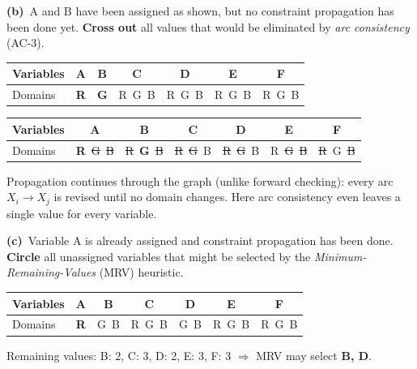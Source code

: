 \documentclass[11pt,a4paper]{article}
\newcommand{\subq}[1]{\par\smallskip\noindent\textbf{#1}\ }
\begin{document}
\subq{(b)}A and B have been assigned as shown, but no constraint propagation has been done yet. \textbf{Cross out} all values that would be eliminated by \emph{arc consistency} (AC-3).\begin{center}\small\begin{tabular}{|l|c|c|c|c|c|c|}\hline Variables & \textbf{A} & \textbf{B} & \textbf{C} & \textbf{D} & \textbf{E} & \textbf{F}\\ \hline Domains & \textbf{R} & \textbf{G} & R\ G\ B & R\ G\ B & R\ G\ B & R\ G\ B\\ \hline\end{tabular}\end{center}
\begin{solbox}
\begin{center}\small\begin{tabular}{|l|c|c|c|c|c|c|}\hline Variables & \textbf{A} & \textbf{B} & \textbf{C} & \textbf{D} & \textbf{E} & \textbf{F}\\ \hline Domains & \textbf{R}\ \textcolor{red!70!black}{\sout{G}}\ \textcolor{red!70!black}{\sout{B}} & \textcolor{red!70!black}{\sout{R}}\ \textbf{G}\ \textcolor{red!70!black}{\sout{B}} & \textcolor{red!70!black}{\sout{R}}\ \textcolor{red!70!black}{\sout{G}}\ B & \textcolor{red!70!black}{\sout{R}}\ \textcolor{red!70!black}{\sout{G}}\ B & R\ \textcolor{red!70!black}{\sout{G}}\ \textcolor{red!70!black}{\sout{B}} & \textcolor{red!70!black}{\sout{R}}\ G\ \textcolor{red!70!black}{\sout{B}}\\ \hline\end{tabular}\end{center}Propagation continues through the graph (unlike forward checking): every arc $X_i\to X_j$ is revised until no domain changes. Here arc consistency even leaves a single value for every variable.
\end{solbox}
\subq{(c)}Variable A is already assigned and constraint propagation has been done. \textbf{Circle} all unassigned variables that might be selected by the \emph{Minimum-Remaining-Values} (MRV) heuristic.\begin{center}\small\begin{tabular}{|l|c|c|c|c|c|c|}\hline Variables & \textbf{A} & \textbf{B} & \textbf{C} & \textbf{D} & \textbf{E} & \textbf{F}\\ \hline Domains & \textbf{R} & G\ B & R\ G\ B & G\ B & R\ G\ B & R\ G\ B\\ \hline\end{tabular}\end{center}
\begin{solbox}
Remaining values: B: 2, C: 3, D: 2, E: 3, F: 3 $\Rightarrow$ MRV may select \textbf{B, D}.
\end{solbox}
\end{document}
